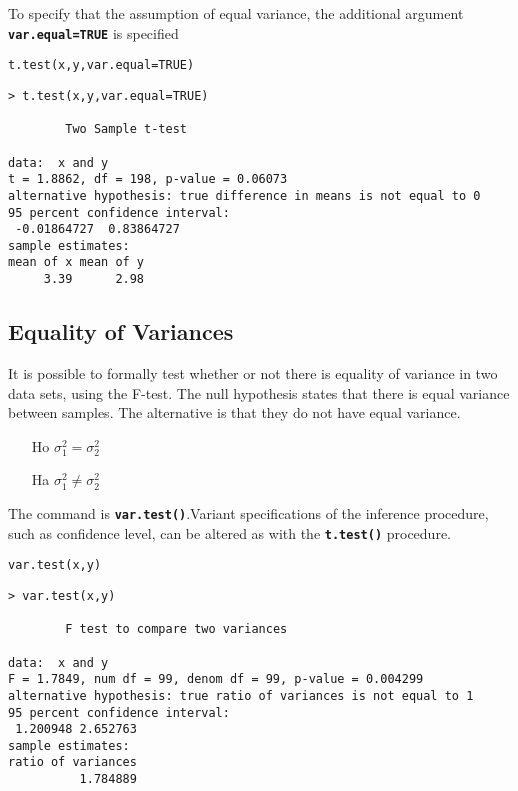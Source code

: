\documentclass[a4paper,12pt]{article}
\begin{document}
To specify that the assumption of equal variance, the additional argument \textbf{\texttt{var.equal=TRUE}} is specified

\begin{framed}
\begin{verbatim}
t.test(x,y,var.equal=TRUE)
\end{verbatim}

\end{framed}

\begin{verbatim}
> t.test(x,y,var.equal=TRUE)

        Two Sample t-test

data:  x and y
t = 1.8862, df = 198, p-value = 0.06073
alternative hypothesis: true difference in means is not equal to 0
95 percent confidence interval:
 -0.01864727  0.83864727
sample estimates:
mean of x mean of y
     3.39      2.98
\end{verbatim}

\subsection{Equality of Variances}
It is possible to formally test whether or not there is equality of variance in two data sets, using the F-test.
The null hypothesis states that there is equal variance between samples. The alternative is that they do not have equal variance.
\begin{itemize}
\item[Ho] $\sigma^2_1 = \sigma^2_2$
\item[Ha] $\sigma^2_1 \neq \sigma^2_2$
\end{itemize}

The command is \textbf{\texttt{var.test()}}.Variant specifications of the inference procedure, such as confidence level, can be altered as with the \texttt{\textbf{t.test()}} procedure.
\begin{framed}
\begin{verbatim}
var.test(x,y)
\end{verbatim}
\end{framed}
\begin{verbatim}
> var.test(x,y)

        F test to compare two variances

data:  x and y
F = 1.7849, num df = 99, denom df = 99, p-value = 0.004299
alternative hypothesis: true ratio of variances is not equal to 1
95 percent confidence interval:
 1.200948 2.652763
sample estimates:
ratio of variances
          1.784889
\end{verbatim}
\end{document}
